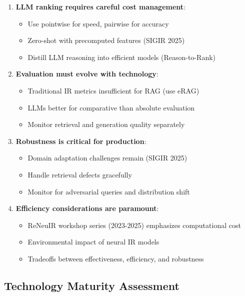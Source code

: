 \documentclass[11pt,letterpaper]{article}
\begin{document}
\begin{enumerate}[leftmargin=*]
    \item \textbf{LLM ranking requires careful cost management}:
    \begin{itemize}
        \item Use pointwise for speed, pairwise for accuracy
        \item Zero-shot with precomputed features (SIGIR 2025)
        \item Distill LLM reasoning into efficient models (Reason-to-Rank)
    \end{itemize}

    \item \textbf{Evaluation must evolve with technology}:
    \begin{itemize}
        \item Traditional IR metrics insufficient for RAG (use eRAG)
        \item LLMs better for comparative than absolute evaluation
        \item Monitor retrieval and generation quality separately
    \end{itemize}

    \item \textbf{Robustness is critical for production}:
    \begin{itemize}
        \item Domain adaptation challenges remain (SIGIR 2025)
        \item Handle retrieval defects gracefully
        \item Monitor for adversarial queries and distribution shift
    \end{itemize}

    \item \textbf{Efficiency considerations are paramount}:
    \begin{itemize}
        \item ReNeuIR workshop series (2023-2025) emphasizes computational cost
        \item Environmental impact of neural IR models
        \item Tradeoffs between effectiveness, efficiency, and robustness
    \end{itemize}
\end{enumerate}

\subsection{Technology Maturity Assessment}
\end{document}

